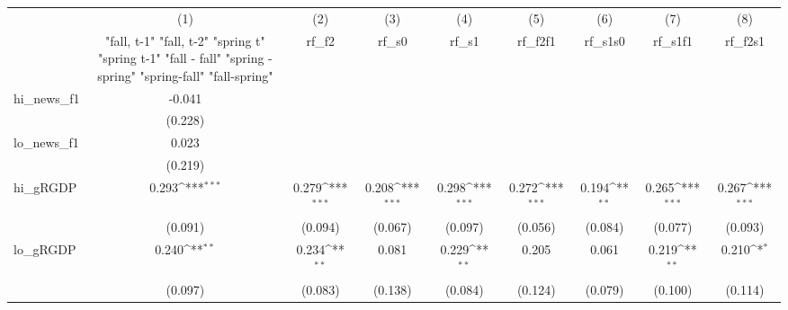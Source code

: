 {
\def\sym#1{\ifmmode^{#1}\else\(^{#1}\)\fi}
\begin{tabular}{l*{8}{c}}
\toprule
            &\multicolumn{1}{c}{(1)}&\multicolumn{1}{c}{(2)}&\multicolumn{1}{c}{(3)}&\multicolumn{1}{c}{(4)}&\multicolumn{1}{c}{(5)}&\multicolumn{1}{c}{(6)}&\multicolumn{1}{c}{(7)}&\multicolumn{1}{c}{(8)}\\
            &\multicolumn{1}{c}{  "fall, t-1" "fall, t-2" "spring t" "spring t-1"  "fall - fall" "spring - spring" "spring-fall" "fall-spring" }&\multicolumn{1}{c}{rf\_f2}&\multicolumn{1}{c}{rf\_s0}&\multicolumn{1}{c}{rf\_s1}&\multicolumn{1}{c}{rf\_f2f1}&\multicolumn{1}{c}{rf\_s1s0}&\multicolumn{1}{c}{rf\_s1f1}&\multicolumn{1}{c}{rf\_f2s1}\\
\midrule
hi\_news\_f1  &      -0.041         &                     &                     &                     &                     &                     &                     &                     \\
            &     (0.228)         &                     &                     &                     &                     &                     &                     &                     \\
\addlinespace
lo\_news\_f1  &       0.023         &                     &                     &                     &                     &                     &                     &                     \\
            &     (0.219)         &                     &                     &                     &                     &                     &                     &                     \\
\addlinespace
hi\_gRGDP    &       0.293\sym{***}&       0.279\sym{***}&       0.208\sym{***}&       0.298\sym{***}&       0.272\sym{***}&       0.194\sym{**} &       0.265\sym{***}&       0.267\sym{***}\\
            &     (0.091)         &     (0.094)         &     (0.067)         &     (0.097)         &     (0.056)         &     (0.084)         &     (0.077)         &     (0.093)         \\
\addlinespace
lo\_gRGDP    &       0.240\sym{**} &       0.234\sym{**} &       0.081         &       0.229\sym{**} &       0.205         &       0.061         &       0.219\sym{**} &       0.210\sym{*}  \\
            &     (0.097)         &     (0.083)         &     (0.138)         &     (0.084)         &     (0.124)         &     (0.079)         &     (0.100)         &     (0.114)         \\

\end{tabular}}

